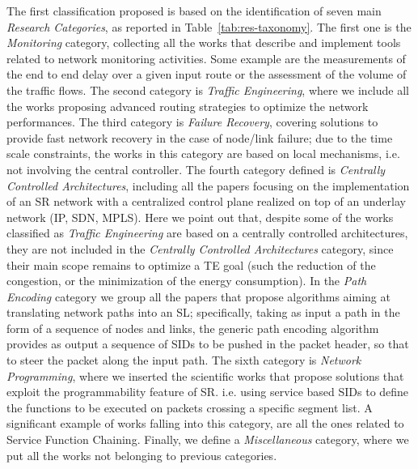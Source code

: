 The first classification proposed is based on the identification of seven main \emph{Research Categories}, as reported in Table~\ref{tab:res-taxonomy}.
The first one is the \emph{Monitoring} category, collecting all the works that describe and implement tools related to network monitoring activities.
Some example are the measurements of the end to end delay over a given input route or the assessment of the volume of the traffic flows.
The second category is \emph{Traffic Engineering}, where we include all the works proposing advanced routing strategies to optimize the network performances.
The third category is \emph{Failure Recovery}, covering solutions to provide fast network recovery in the case of node/link failure; due to the time scale constraints, the works in this category are based on local mechanisms, i.e. not involving the central controller.
The fourth category defined is \emph{Centrally Controlled Architectures}, including all the papers focusing on the implementation of an SR network with a centralized control plane realized on top of an underlay network (IP, SDN, MPLS). Here we point out that, despite some of the works classified as \emph{Traffic Engineering} are based on a centrally controlled architectures, they are not included in the \emph{Centrally Controlled Architectures} category, since their main scope remains to optimize a TE goal (such the reduction of the congestion, or the minimization of the energy consumption).
In the \emph{Path Encoding} category we group all the papers that propose algorithms aiming at translating network paths into an SL; specifically, taking as input a path in the form of a sequence of nodes and links, the generic path encoding algorithm provides as output a sequence of SIDs to be pushed in the packet header, so that to steer the packet along the input path.
The sixth category is \emph{Network Programming}, where we inserted the scientific works that propose solutions that exploit the programmability feature of SR. i.e. using service based SIDs to define the functions to be executed on packets crossing a specific segment list. A significant example of works falling into this category, are all the ones related to Service Function Chaining.  
Finally, we define a \emph{Miscellaneous} category, where we put all the works not belonging to previous categories.


